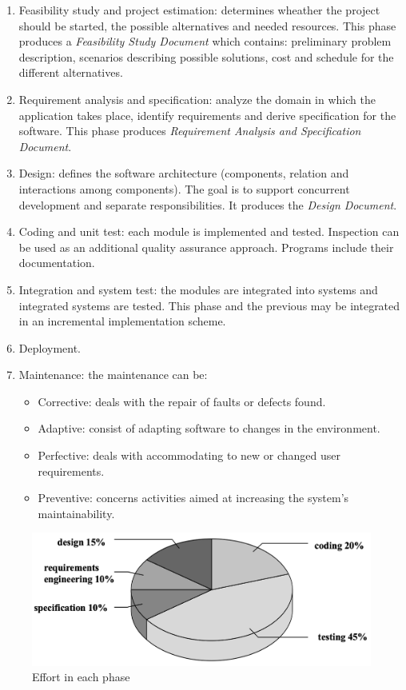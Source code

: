 \documentclass[12pt, a4paper]{report}
\theoremstyle{remark}
\begin{document}
    \begin{enumerate}
        \item Feasibility study and project estimation: determines wheather the project should be started, the possible alternatives and needed resources. This phase produces a \emph{Feasibility Study Document} which contains: preliminary problem description, scenarios describing possible solutions, cost and schedule for the different alternatives.
        \item Requirement analysis and specification: analyze the domain in which the application takes place, identify requirements and derive specification for the software. This phase produces \emph{Requirement Analysis and Specification Document}.
        \item Design: defines the software architecture (components, relation and interactions among components). The goal is to support concurrent development and separate responsibilities. It produces the \emph{Design Document}.
        \item Coding and unit test: each module is implemented and tested. Inspection can be used as an additional quality assurance approach. Programs include their documentation. 
        \item Integration and system test: the modules are integrated into systems and integrated systems are tested. This phase and the previous may be integrated in an incremental implementation scheme. 
        \item Deployment.
        \item Maintenance: the maintenance can be:
        \begin{itemize}
            \item Corrective: deals with the repair of faults or defects found.
            \item Adaptive: consist of adapting software to changes in the environment.
            \item Perfective: deals with accommodating to new or changed user requirements.
            \item Preventive: concerns activities aimed at increasing the system's maintainability. 
        \end{itemize}
    \end{enumerate}
    \begin{figure}
        \centering
        \includegraphics[width=1\linewidth]{images/effort.png}
        \caption{Effort in each phase}
    \end{figure}
\end{document}
